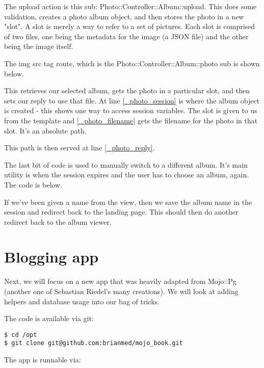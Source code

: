 \documentclass[14pt]{extreport}
\begin{document}
The upload action is this sub: Photo::Controller::Album::upload.  This does
some validation, creates a photo album object, and then stores the photo in a
new "slot".  A slot is merely a way to refer to a set of pictures.  Each slot
is comprised of two files, one being the metadata for the image (a JSON file)
and the other being the image itself.

The img src tag route, which is the Photo::Controller::Album::photo sub is shown below.



This retrieves our selected album, gets the photo in a particular slot, and
then sets our reply to use that file. At line \ref{_photo_session} is where the
album object is created - this shows one way to access session variables. The slot
is given to us from the template and \ref{_photo_filename} gets the filename
for the photo in that slot.  It's an absolute path.

This path is then served at line \ref{_photo_reply}.

The last bit of code is used to manually switch to a different album. It's main utility
is when the session expires and the user has to choose an album, again.  The code is
below.



If we've been given a name from the view, then we save the album name in the session and
redirect back to the landing page.  This should then do another redirect back to the
album viewer.

\section{Blogging app}

Next, we will focus on a new app that was heavily adapted from Mojo::Pg
(another one of Sebastian Riedel's many creations).  We will look at adding
helpers and database usage into our bag of tricks.

The code is available via git:

\begin{lstlisting}[style=BashOutputStyle]
$ cd /opt
$ git clone git@github.com:brianmed/mojo_book.git
\end{lstlisting}

The app is runnable via:
\end{document}
